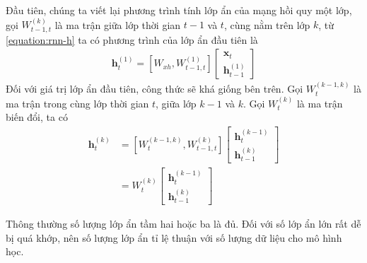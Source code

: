 Đầu tiên, chúng ta viết lại phương trình tính lớp ẩn của mạng hồi quy một lớp, gọi $W^{(k)}_{t-1,t}$ là ma trận giữa lớp thời gian $t-1$ và $t$, cùng nằm trên lớp $k$, từ \ref{equation:rnn-h} ta có phương trình của lớp ẩn đầu tiên là
\begin{align}
    \mathbf h_t^{(1)}=\left[W_{xh},W^{(1)}_{t-1,t}\right]
    \begin{bmatrix}
        \mathbf x_t \\
        \mathbf h_{t-1}^{(1)}
    \end{bmatrix}
\end{align}
Đối với giá trị lớp ẩn đầu tiên, công thức sẽ khá giống bên trên. Gọi $W^{(k-1,k)}_{t}$ là ma trận trong cùng lớp thời gian $t$, giữa lớp $k-1$ và $k$. Gọi $W^{(k)}_{t}$ là ma trận biến đổi, ta có
\begin{align}
    \mathbf h_t^{(k)} & =\left[W^{(k-1,k)}_{t},W^{(k)}_{t-1,t}\right]
    \begin{bmatrix}
        \mathbf h_{t}^{(k-1)} \\
        \mathbf h_{t-1}^{(k)}
    \end{bmatrix}                                           \nonumber \\
                      & =W^{(k)}_{t}
    \begin{bmatrix}
        \mathbf h_{t}^{(k-1)} \\
        \mathbf h_{t-1}^{(k)}
    \end{bmatrix}\label{equation:rnn-multi-layer}
\end{align}

Thông thường số lượng lớp ẩn tầm hai hoặc ba là đủ. Đối với số lớp ẩn lớn rất dễ bị quá khớp, nên số lượng lớp ẩn tỉ lệ thuận với số lượng dữ liệu cho mô hình học.